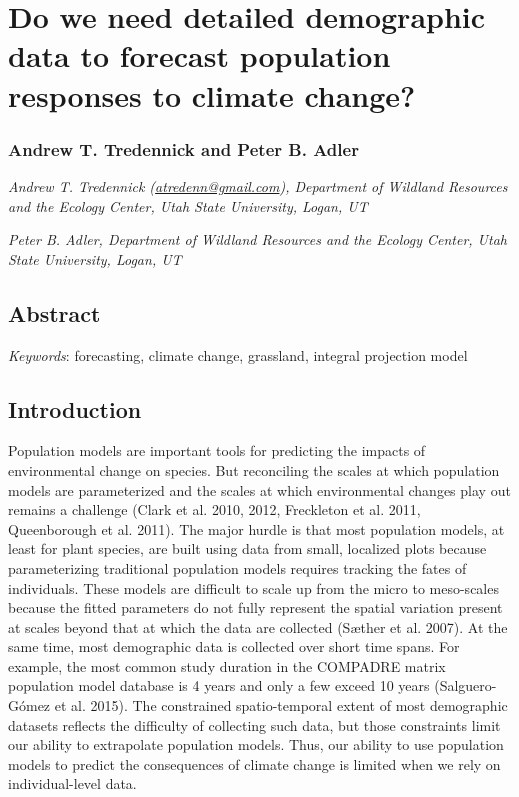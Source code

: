 \documentclass[12pt,]{article}
\author{}
\date{}
\begin{document}
\normalsize


\section{Do we need detailed demographic data to forecast population
responses to climate
change?}\label{do-we-need-detailed-demographic-data-to-forecast-population-responses-to-climate-change}

\subsubsection{Andrew T. Tredennick and Peter B.
Adler}\label{andrew-t.-tredennick-and-peter-b.-adler}

\emph{Andrew T. Tredennick
(\href{mailto:atredenn@gmail.com}{\href{mailto:atredenn@gmail.com}{atredenn@gmail.com}}),
Department of Wildland Resources and the Ecology Center, Utah State
University, Logan, UT}

\emph{Peter B. Adler, Department of Wildland Resources and the Ecology
Center, Utah State University, Logan, UT}

\subsection{Abstract}\label{abstract}

\emph{Keywords}: forecasting, climate change, grassland, integral
projection model

\subsection{Introduction}\label{introduction}

Population models are important tools for predicting the impacts of
environmental change on species. But reconciling the scales at which
population models are parameterized and the scales at which
environmental changes play out remains a challenge (Clark et al. 2010,
2012, Freckleton et al. 2011, Queenborough et al. 2011). The major
hurdle is that most population models, at least for plant species, are
built using data from small, localized plots because parameterizing
traditional population models requires tracking the fates of
individuals. These models are difficult to scale up from the micro to
meso-scales because the fitted parameters do not fully represent the
spatial variation present at scales beyond that at which the data are
collected (Sæther et al. 2007). At the same time, most demographic data
is collected over short time spans. For example, the most common study
duration in the COMPADRE matrix population model database is 4 years and
only a few exceed 10 years (Salguero-Gómez et al. 2015). The constrained
spatio-temporal extent of most demographic datasets reflects the
difficulty of collecting such data, but those constraints limit our
ability to extrapolate population models. Thus, our ability to use
population models to predict the consequences of climate change is
limited when we rely on individual-level data.
\end{document}
